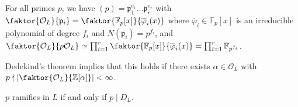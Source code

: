 \begin{theorem}
    For all primes \( p \), we have \( (p) = \mathfrak p_1^{e_1} \dots \mathfrak p_r^{e_r} \) with \( \faktor{\mathcal O_L}{\mathfrak p_i} = \faktor{\mathbb F_p[x]}{\overline\varphi_i(x)} \) where \( \overline\varphi_i \in \mathbb F_p[x] \) is an irreducible polynomial of degree \( f_i \) and \( N(\mathfrak p_i) = p^{f_i} \), and \( \faktor{\mathcal O_L}{p\mathcal O_L} \simeq \prod_{i=1}^r \faktor{\mathbb F_p[x]}{\overline\varphi_i(x)} = \prod_{i=1}^r \mathbb F_{p^{f_i}} \).
\end{theorem}
Dedekind's theorem implies that this holds if there exists \( \alpha \in \mathcal O_L \) with \( p \nmid \abs{\faktor{\mathcal O_L}{\mathbb Z[\alpha]}} < \infty \).
\begin{theorem}
    \( p \) ramifies in \( L \) if and only if \( p \mid D_L \).
\end{theorem}
